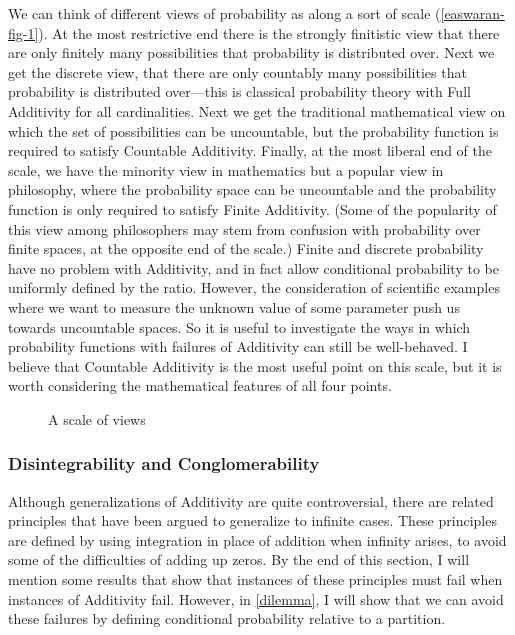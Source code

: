 We can think of different views of probability as along a sort of scale (\autoref{easwaran-fig-1}). At the most restrictive end there is the strongly finitistic view that there are only finitely many possibilities that probability is distributed over. Next we get the discrete view, that there are only countably many possibilities that probability is distributed over---this is classical probability theory with Full Additivity for all cardinalities. Next we get the traditional mathematical view on which the set of possibilities can be uncountable, but the probability function is required to satisfy Countable Additivity. Finally, at the most liberal end of the scale, we have the minority view in mathematics but a popular view in philosophy, where the probability space can be uncountable and the probability function is only required to satisfy Finite Additivity. (Some of the popularity of this view among philosophers may stem from confusion with probability over finite spaces, at the opposite end of the scale.) Finite and discrete probability have no problem with Additivity, and in fact allow conditional probability to be uniformly defined by the ratio. However, the consideration of scientific examples where we want to measure the unknown value of some parameter push us towards uncountable spaces. So it is useful to investigate the ways in which probability functions with failures of Additivity can still be well-behaved. I believe that Countable Additivity is the most useful point on this scale, but it is worth considering the mathematical features of all four points.
\begin{figure}[h]
  \centering
  \caption{A scale of views}\label{easwaran-fig-1}
  \end{figure}

\subsubsection{Disintegrability and Conglomerability}\label{disint}

Although generalizations of Additivity are quite controversial, there are related principles that have been argued to generalize to infinite cases. These principles are defined by using integration in place of addition when infinity arises, to avoid some of the difficulties of adding up zeros. By the end of this section, I will mention some results that show that instances of these principles must fail when instances of Additivity fail. However, in \autoref{dilemma}, I will show that we can avoid these failures by defining conditional probability relative to a partition.

